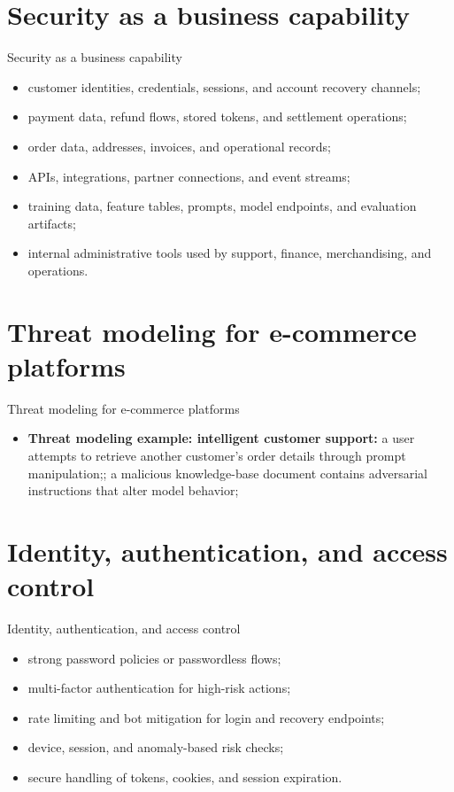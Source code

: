 \documentclass[aspectratio=169]{beamer}
\begin{document}
\section{Security as a business capability}

\begin{frame}{Security as a business capability}
  \begin{itemize}
    \item customer identities, credentials, sessions, and account recovery channels;
    \item payment data, refund flows, stored tokens, and settlement operations;
    \item order data, addresses, invoices, and operational records;
    \item APIs, integrations, partner connections, and event streams;
    \item training data, feature tables, prompts, model endpoints, and evaluation artifacts;
    \item internal administrative tools used by support, finance, merchandising, and operations.
  \end{itemize}
\end{frame}

\section{Threat modeling for e-commerce platforms}

\begin{frame}{Threat modeling for e-commerce platforms}
  \begin{itemize}
    \item \textbf{Threat modeling example: intelligent customer support:} a user attempts to retrieve another customer's order details through prompt manipulation;; a malicious knowledge-base document contains adversarial instructions that alter model behavior;
  \end{itemize}
\end{frame}

\section{Identity, authentication, and access control}

\begin{frame}{Identity, authentication, and access control}
  \begin{itemize}
    \item strong password policies or passwordless flows;
    \item multi-factor authentication for high-risk actions;
    \item rate limiting and bot mitigation for login and recovery endpoints;
    \item device, session, and anomaly-based risk checks;
    \item secure handling of tokens, cookies, and session expiration.
  \end{itemize}
\end{frame}
\end{document}
